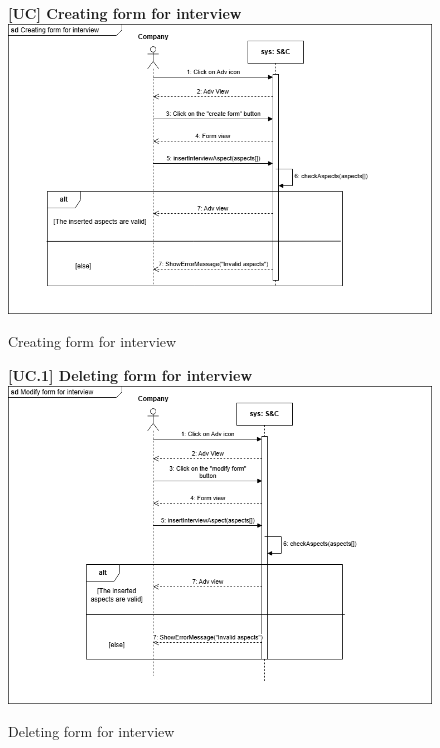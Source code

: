 \begin{figure}[H]
\textbf{[UC\nextUCDiagr] Creating form for interview}\newline\newline
    \includegraphics[width=15cm]{Images/UC_diagram/RASD-UC21.drawio.png}
    \caption{Creating form for interview}
\end{figure}

\begin{figure}[H]
\textbf{[UC\nextUCDiagr.1] Deleting form for interview}\newline\newline
    \includegraphics[width=15cm]{Images/UC_diagram/RASD-UC22.drawio.png}
    \caption{Deleting form for interview}
\end{figure}

